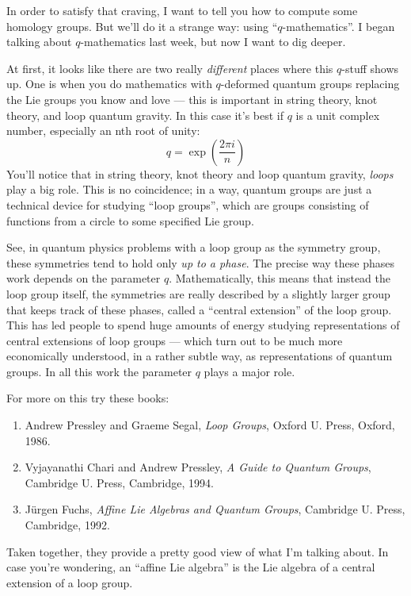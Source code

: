 \documentclass{article}
\begin{document}
In order to satisfy that craving, I want to tell you how to compute some
homology groups. But we'll do it a strange way: using
``\(q\)-mathematics''. I began talking about \(q\)-mathematics last
week, but now I want to dig deeper.

At first, it looks like there are two really \emph{different} places
where this \(q\)-stuff shows up. One is when you do mathematics with
\(q\)-deformed quantum groups replacing the Lie groups you know and love
--- this is important in string theory, knot theory, and loop quantum
gravity. In this case it's best if \(q\) is a unit complex number,
especially an nth root of unity:
\[q = \exp\left(\frac{2\pi i}{n}\right)\] You'll notice that in string
theory, knot theory and loop quantum gravity, \emph{loops} play a big
role. This is no coincidence; in a way, quantum groups are just a
technical device for studying ``loop groups'', which are groups
consisting of functions from a circle to some specified Lie group.

See, in quantum physics problems with a loop group as the symmetry
group, these symmetries tend to hold only \emph{up to a phase}. The
precise way these phases work depends on the parameter \(q\).
Mathematically, this means that instead the loop group itself, the
symmetries are really described by a slightly larger group that keeps
track of these phases, called a ``central extension'' of the loop group.
This has led people to spend huge amounts of energy studying
representations of central extensions of loop groups --- which turn out
to be much more economically understood, in a rather subtle way, as
representations of quantum groups. In all this work the parameter \(q\)
plays a major role.

For more on this try these books:

\begin{enumerate}
\def\labelenumi{\arabic{enumi})}
\setcounter{enumi}{1}
\item
  Andrew Pressley and Graeme Segal, \emph{Loop Groups}, Oxford U. Press,
  Oxford, 1986.
\item
  Vyjayanathi Chari and Andrew Pressley, \emph{A Guide to Quantum
  Groups}, Cambridge U. Press, Cambridge, 1994.
\item
  Jürgen Fuchs, \emph{Affine Lie Algebras and Quantum Groups}, Cambridge
  U. Press, Cambridge, 1992.
\end{enumerate}

Taken together, they provide a pretty good view of what I'm talking
about. In case you're wondering, an ``affine Lie algebra'' is the Lie
algebra of a central extension of a loop group.
\end{document}
